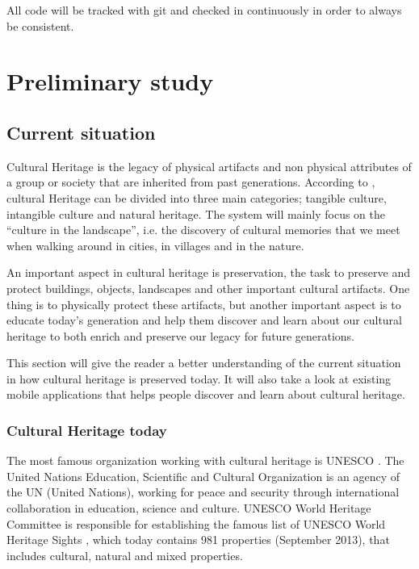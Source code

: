 \documentclass[11pt]{book}
\begin{document}
All code will be tracked with git and checked in continuously in order to always be consistent.

\chapter{Preliminary study}
\label{chap:preliminary_study}

\section{Current situation}
Cultural Heritage is the legacy of physical artifacts and non physical attributes of a group or society that are inherited from past generations. According to \cite{CiD:culturalheritage}, cultural Heritage can be divided into three main categories; tangible culture, intangible culture and natural heritage. The system will mainly focus on the ``culture in the landscape'', i.e. the discovery of cultural memories that we meet when walking around in cities, in villages and in the nature.

An important aspect in cultural heritage is preservation, the task to preserve and protect buildings, objects, landscapes and other important cultural artifacts. One thing is to physically protect these artifacts, but another important aspect is to educate today's generation and help them discover and learn about our cultural heritage to both enrich and preserve our legacy for future generations.

This section will give the reader a better understanding of the current situation in how cultural heritage is preserved today. It will also take a look at existing mobile applications that helps people discover and learn about cultural heritage.

\subsection{Cultural Heritage today}
The most famous organization working with cultural heritage is UNESCO \cite{UNESCO:intro}. The United Nations Education, Scientific and Cultural Organization is an agency of the UN (United Nations), working for peace and security through international collaboration in education, science and culture. UNESCO World Heritage Committee is responsible for establishing  the famous list of UNESCO World Heritage Sights \cite{UNESCO:worldheritage}, which today contains 981 properties (September 2013), that includes cultural, natural and mixed properties.
\end{document}
